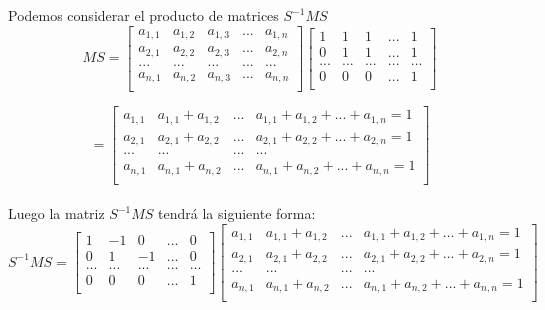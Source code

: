 \documentclass[14pt]{extarticle}
\begin{document}
 Podemos considerar el producto de matrices $S^{-1}MS$
   \[ M S = \begin{bmatrix}
   a_{1,1} & a_{1,2} & a_{1,3} &... & a_{1,n} \\
   a_{2,1} & a_{2,2} & a_{2,3} &...  & a_{2,n}\\
   ... & ... & ...& ... & ... \\		
   a_{n,1} & a_{n,2} & a_{n,3} & ... & a_{n,n}\\
   \end{bmatrix} 
   \begin{bmatrix}
   1 & 1 & 1 &... & 1  \\
   0 & 1 & 1 &... & 1 \\
   ... & ... & ...& ... & ... \\	
   0 & 0 & 0 & ... & 1\\
   \end{bmatrix}\]
   
   \[= \begin{bmatrix}
   a_{1,1} & a_{1,1}+a_{1,2} & ... & a_{1,1} + a_{1,2}+...+a_{1,n} = 1  \\
   a_{2,1} & a_{2,1}+a_{2,2} &... & a_{2,1} + a_{2,2}+...+a_{2,n} = 1  \\
   ... & ... & ... & ... \\	
   a_{n,1} & a_{n,1}+a_{n,2} & ... & a_{n,1} + a_{n,2}+...+a_{n,n} = 1 \\
   \end{bmatrix}\]\\
  
  Luego la matriz  $S^{-1}MS$ tendrá la siguiente forma:\\
     \[ S^{-1}MS = \begin{bmatrix}
     1 & -1 & 0 &... & 0 \\
     0 & 1 & -1 &...  & 0\\
     ... & ... & ...& ... & ... \\		
     0 & 0 & 0 & ... & 1\\
     \end{bmatrix} 
     \begin{bmatrix}
     a_{1,1} & a_{1,1}+a_{1,2} & ... & a_{1,1} + a_{1,2}+...+a_{1,n} = 1  \\
     a_{2,1} & a_{2,1}+a_{2,2} &... & a_{2,1} + a_{2,2}+...+a_{2,n} = 1  \\
     ... & ... & ... & ... \\	
     a_{n,1} & a_{n,1}+a_{n,2} & ... & a_{n,1} + a_{n,2}+...+a_{n,n} = 1 \\
     \end{bmatrix}\]
     
\end{document}
